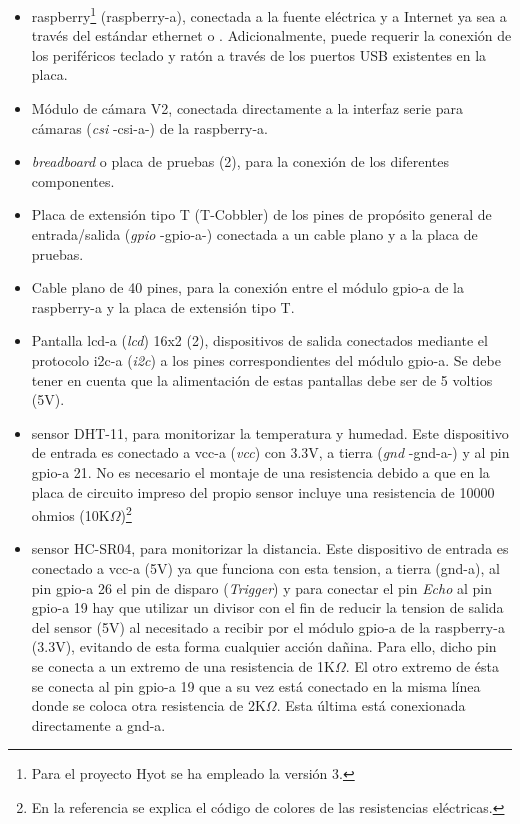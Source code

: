 \documentclass[12pt,a4paper, twoside]{report}
\begin{document}
	\begin{itemize}
		\item \gls{raspberry}\footnote{Para el proyecto Hyot se ha empleado la versión 3.} (\gls{raspberry-a}), conectada a la fuente eléctrica y a Internet ya sea a través del estándar \gls{ethernet} o . Adicionalmente, puede requerir la conexión de los periféricos teclado y ratón a través de los puertos USB existentes en la placa.
		\item Módulo de cámara V2, conectada directamente a la interfaz serie para cámaras (\textit{\gls{csi}} -\gls{csi-a}-) de la \gls{raspberry-a}.
		\item \textit{\Gls{breadboard}} o placa de pruebas (2), para la conexión de los diferentes componentes.
		\item Placa de extensión tipo T (T-Cobbler) de los pines de propósito general de entrada/salida (\textit{\gls{gpio}} -\gls{gpio-a}-) conectada a un cable plano y a la placa de pruebas.
		\item Cable plano de 40 pines, para la conexión entre el módulo \gls{gpio-a} de la \gls{raspberry-a} y la placa de extensión tipo T.
		\item Pantalla \gls{lcd-a} (\textit{\gls{lcd}}) 16x2 (2), dispositivos de salida conectados mediante el protocolo \gls{i2c-a} (\textit{\gls{i2c}}) a los pines correspondientes del módulo \gls{gpio-a}. Se debe tener en cuenta que la alimentación de estas pantallas debe ser de 5 voltios (5V).
		\item \Gls{sensor} DHT-11, para monitorizar la temperatura y humedad. Este dispositivo de entrada es conectado a \gls{vcc-a} (\textit{\gls{vcc}}) con 3.3V, a tierra (\textit{\gls{gnd}} -\gls{gnd-a}-) y al pin \gls{gpio-a} 21. No es necesario el montaje de una \gls{resistencia} debido a que en la placa de circuito impreso del propio \gls{sensor} incluye una \gls{resistencia} de 10000 ohmios (10K$\Omega$)\footnote{En la referencia \cite{abc:rcc} se explica el código de colores de las \glspl{resistencia} eléctricas.}	
		\item \Gls{sensor} HC-SR04, para monitorizar la distancia. Este dispositivo de entrada es conectado a \gls{vcc-a} (5V) ya que funciona con esta \gls{tension}, a tierra (\gls{gnd-a}), al pin \gls{gpio-a} 26 el pin de disparo (\textit{Trigger}) y para conectar el pin \textit{Echo} al pin \gls{gpio-a} 19 hay que utilizar un \gls{divisor} con el fin de reducir la \gls{tension} de salida del \gls{sensor} (5V) al necesitado a recibir por el módulo \gls{gpio-a} de la \gls{raspberry-a} (3.3V), evitando de esta forma cualquier acción dañina. Para ello, dicho pin se conecta a un extremo de una \gls{resistencia} de 1K$\Omega$. El otro extremo de ésta se conecta al pin \gls{gpio-a} 19 que a su vez está conectado en la misma línea donde se coloca otra \gls{resistencia} de 2K$\Omega$. Esta última está conexionada directamente a \gls{gnd-a}.

\end{itemize}
\end{document}
